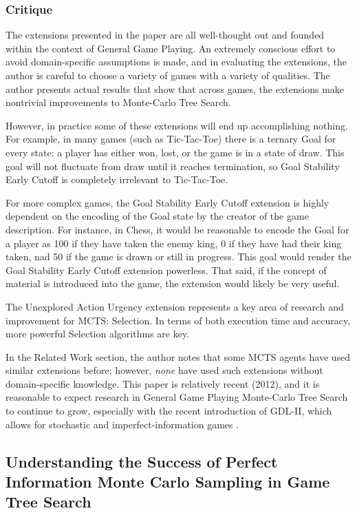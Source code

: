 \documentclass[letterpaper]{article}
\begin{document}
\subsubsection{Critique}

The extensions presented in the paper are all well-thought out and founded within the context of General Game Playing. An extremely conscious effort to avoid domain-specific assumptions is made, and in evaluating the extensions, the author is careful to choose a variety of games with a variety of qualities. The author presents actual results that show that across games, the extensions make nontrivial improvements to Monte-Carlo Tree Search.

However, in practice some of these extensions will end up accomplishing nothing. For example, in many games (such as Tic-Tac-Toe) there is a ternary Goal for every state: a player has either won, lost, or the game is in a state of draw. This goal will not fluctuate from draw until it reaches termination, so Goal Stability Early Cutoff is completely irrelevant to Tic-Tac-Toe.

For more complex games, the Goal Stability Early Cutoff extension is highly dependent on the encoding of the Goal state by the creator of the game description. For instance, in Chess, it would be reasonable to encode the Goal for a player as 100 if they have taken the enemy king, 0 if they have had their king taken, nad 50 if the game is drawn or still in progress. This goal would render the Goal Stability Early Cutoff extension powerless. That said, if the concept of material is introduced into the game, the extension would likely be very useful.

The Unexplored Action Urgency extension represents a key area of research and improvement for MCTS: Selection. In terms of both execution time and accuracy, more powerful Selection algorithms are key.

In the Related Work section, the author notes that some MCTS agents have used similar extensions before; however, \emph{none} have used such extensions without domain-specific knowledge. This paper is relatively recent (2012), and it is reasonable to expect research in General Game Playing Monte-Carlo Tree Search to continue to grow, especially with the recent introduction of GDL-II, which allows for stochastic and imperfect-information games \cite{StanfordGGP}.

\subsection{Understanding the Success of Perfect Information Monte Carlo Sampling in Game Tree Search}
\end{document}
